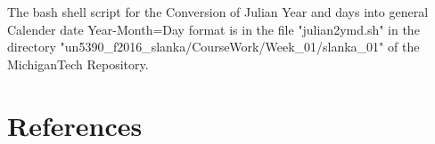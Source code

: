 \documentclass[fleqn,letterpaper,12pt]{report}
\begin{document}
%
\newpage
{}
{}
\problem
The bash shell script for the Conversion of Julian Year and days into general Calender date 
Year-Month=Day format is in the file "julian2ymd.sh" in the directory "un5390\_f2016\_slanka/CourseWork/Week\_01/slanka\_01" of the MichiganTech Repository.\cite{tc}
\vfill
\newpage
{}
\section*{References}


\end{document}
